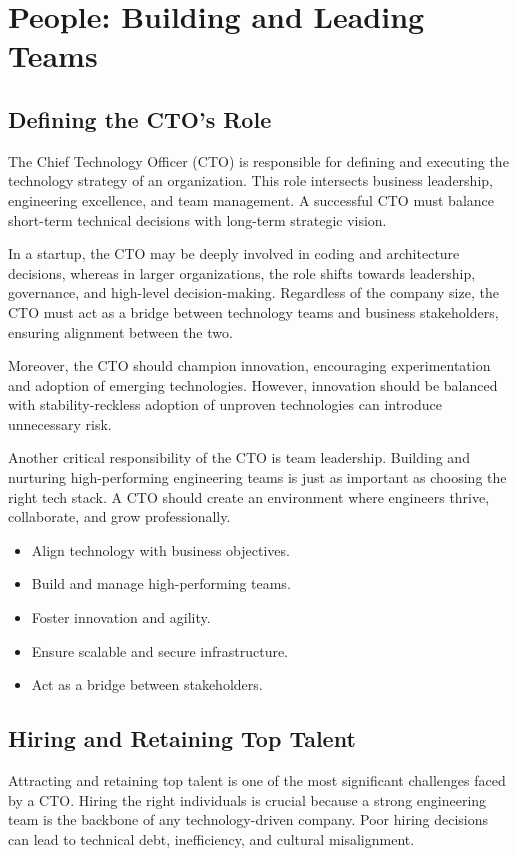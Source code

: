 \chapter{People: Building and Leading Teams}

\section{Defining the CTO's Role}
The Chief Technology Officer (CTO) is responsible for defining and executing the technology strategy of an organization. This role intersects business leadership, engineering excellence, and team management. A successful CTO must balance short-term technical decisions with long-term strategic vision.

In a startup, the CTO may be deeply involved in coding and architecture decisions, whereas in larger organizations, the role shifts towards leadership, governance, and high-level decision-making. Regardless of the company size, the CTO must act as a bridge between technology teams and business stakeholders, ensuring alignment between the two.

Moreover, the CTO should champion innovation, encouraging experimentation and adoption of emerging technologies. However, innovation should be balanced with stability-reckless adoption of unproven technologies can introduce unnecessary risk.

Another critical responsibility of the CTO is team leadership. Building and nurturing high-performing engineering teams is just as important as choosing the right tech stack. A CTO should create an environment where engineers thrive, collaborate, and grow professionally.

\begin{itemize}
    \item Align technology with business objectives.
    \item Build and manage high-performing teams.
    \item Foster innovation and agility.
    \item Ensure scalable and secure infrastructure.
    \item Act as a bridge between stakeholders.
\end{itemize}

\section{Hiring and Retaining Top Talent}
Attracting and retaining top talent is one of the most significant challenges faced by a CTO. Hiring the right individuals is crucial because a strong engineering team is the backbone of any technology-driven company. Poor hiring decisions can lead to technical debt, inefficiency, and cultural misalignment.

